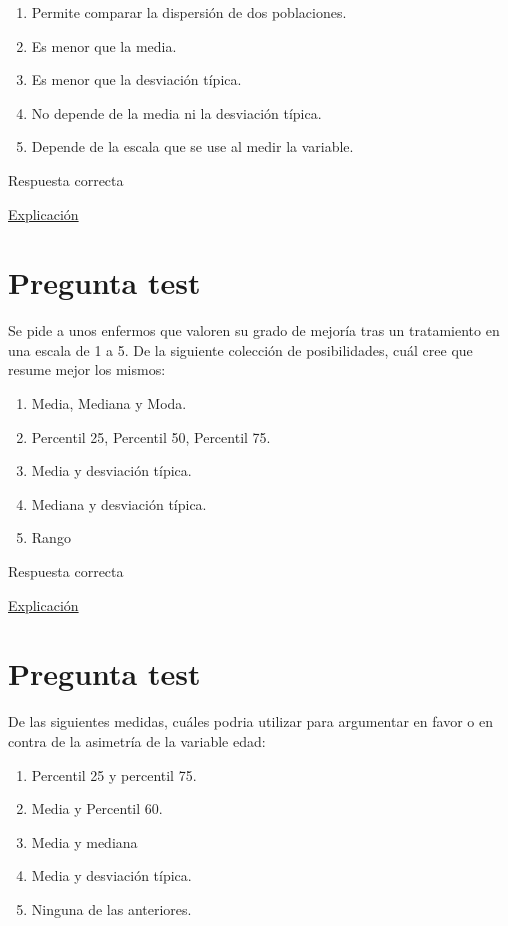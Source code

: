 \documentclass[
]{book}
\providecommand{\tightlist}{%
  \setlength{\itemsep}{0pt}\setlength{\parskip}{0pt}}
\begin{document}
\begin{enumerate}
\def\labelenumi{\alph{enumi})}
\tightlist
\item
  Permite comparar la dispersión de dos poblaciones.
\item
  Es menor que la media.
\item
  Es menor que la desviación típica.
\item
  No depende de la media ni la desviación típica.
\item
  Depende de la escala que se use al medir la variable.
\end{enumerate}

Respuesta correcta

\href{https://en.wikipedia.org/wiki/Coefficient_of_variation}{Explicación}

\hypertarget{pregunta-test-40}{%
\section{Pregunta test}\label{pregunta-test-40}}

Se pide a unos enfermos que valoren su grado de mejoría tras un tratamiento en una escala de 1 a 5. De la siguiente colección de posibilidades, cuál cree que resume mejor los mismos:

\begin{enumerate}
\def\labelenumi{\alph{enumi})}
\tightlist
\item
  Media, Mediana y Moda.
\item
  Percentil 25, Percentil 50, Percentil 75.
\item
  Media y desviación típica.
\item
  Mediana y desviación típica.
\item
  Rango
\end{enumerate}

Respuesta correcta

\href{https://1fjmanzano.github.io/bioestadistica/medidas-de-posicio\%CC\%81n-dispersio\%CC\%81n-y-forma.html\#medidas-de-dispersio\%CC\%81n}{Explicación}

\hypertarget{pregunta-test-41}{%
\section{Pregunta test}\label{pregunta-test-41}}

De las siguientes medidas, cuáles podria utilizar para argumentar en favor o en contra de la asimetría de la variable edad:

\begin{enumerate}
\def\labelenumi{\alph{enumi})}
\tightlist
\item
  Percentil 25 y percentil 75.
\item
  Media y Percentil 60.
\item
  Media y mediana
\item
  Media y desviación típica.
\item
  Ninguna de las anteriores.
\end{enumerate}
\end{document}
